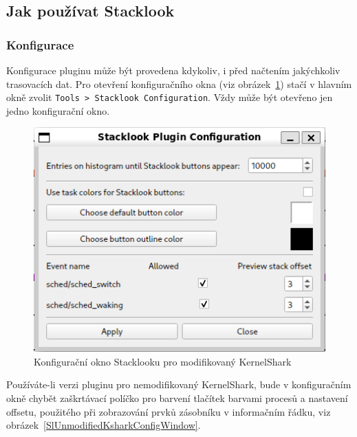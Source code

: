 \subsection{Jak používat Stacklook}

\subsubsection{Konfigurace}

Konfigurace pluginu může být provedena kdykoliv, i před načtením jakýchkoliv trasovacích dat. Pro otevření konfiguračního okna (viz obrázek~\ref{SlConfigWindow}) stačí v hlavním okně zvolit \texttt{Tools > Stacklook Configuration}. Vždy může být otevřeno jen jedno konfigurační okno.

\begin{figure}[p]\centering
    \includegraphics[width=140mm]{img/Stacklook/SlConfigWindow}
    \caption{Konfigurační okno Stacklooku pro modifikovaný KernelShark}
    \label{SlConfigWindow}
\end{figure}

Používáte-li verzi pluginu pro nemodifikovaný KernelShark, bude v konfiguračním okně chybět zaškrtávací políčko pro barvení tlačítek barvami procesů a nastavení offsetu, použitého při zobrazování prvků zásobníku v informačním řádku, viz obrázek~\ref{SlUnmodifiedKsharkConfigWindow}.


